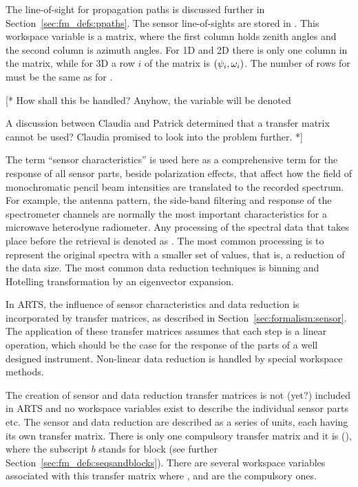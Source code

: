 The line-of-sight for propagation paths is discussed further in
Section~\ref{sec:fm_defs:ppaths}. The sensor line-of-sights are stored in
. This workspace variable is a matrix, where the
first column holds zenith angles and the second column is azimuth
angles. For 1D and 2D there is only one column in the matrix, while
for 3D a row $i$ of the matrix is $(\psi_{i},\omega_{i})$. The
number of rows for  must be the same as for
.


\label{sec:fm_defs:sensorpol}

[* How shall this be handled? Anyhow, the variable will be denoted

A discussion between Claudia and Patrick determined that a transfer
matrix cannot be used? Claudia promised to look into the problem further. *]


\label{sec:fm_defs:sensorchar}

The term ``sensor characteristics'' 
is used here as a
comprehensive term for the response of all sensor parts, beside
polarization effects, that affect how the field of monochromatic
pencil beam intensities are translated to the recorded spectrum. For
example, the antenna pattern, the side-band filtering and response of
the spectrometer channels are normally the most important
characteristics for a microwave heterodyne radiometer. Any processing
of the spectral data that takes place before the retrieval is denoted
as . The most common processing is to represent
the original spectra with a smaller set of values, that is, a
reduction of the data size. The most common data reduction techniques
is binning and Hotelling transformation by an eigenvector expansion.

In ARTS, the influence of sensor characteristics and data reduction is 
incorporated by transfer matrices, as
described in Section~\ref{sec:formalism:sensor}. The application of
these transfer matrices assumes that each step is a linear operation,
which should be the case for the response of the parts of a well
designed instrument. Non-linear data reduction is handled by special
workspace methods.

The creation of sensor and data reduction transfer matrices is not
(yet?) included in ARTS and no workspace variables exist to describe
the individual sensor parts etc. The sensor and data reduction are
described as a series of units, each having its own transfer matrix.
There is only one compulsory transfer matrix and it is 
(), where the subscript $b$ stands for block (see further
Section~\ref{sec:fm_defs:seqsandblocks}). There are several workspace
variables associated with this transfer matrix where
,  and
 are the compulsory ones.

